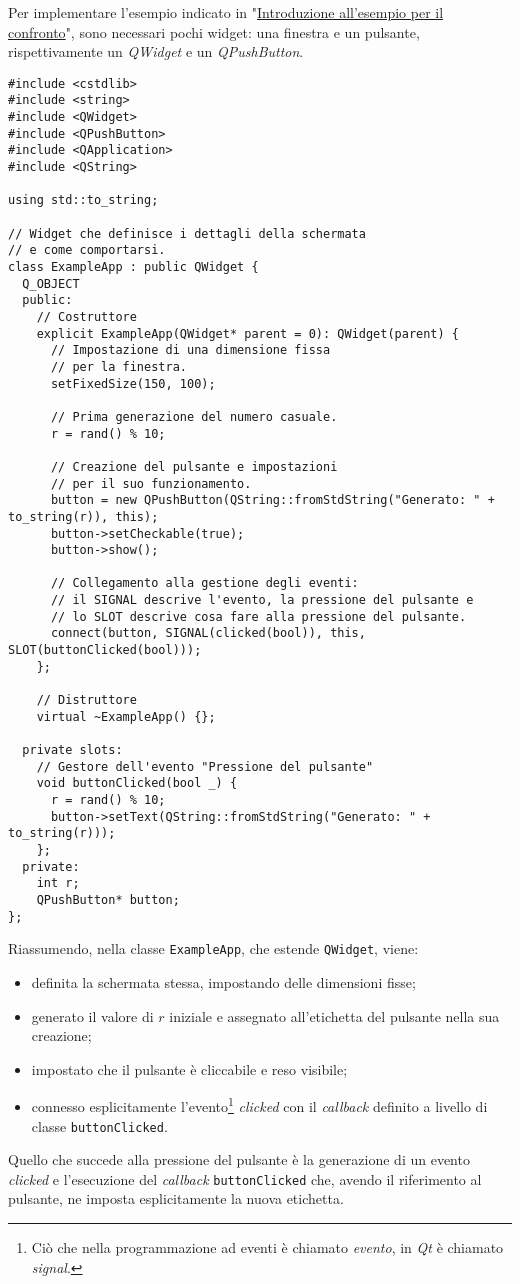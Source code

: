Per implementare l'esempio indicato in "\hyperref[sec:introduzione-esempio-confronto-paradigmi]{Introduzione all'esempio per il confronto}", sono necessari pochi widget: una finestra e un pulsante, rispettivamente un \emph{QWidget} e un \emph{QPushButton}.
\begin{lstlisting}
#include <cstdlib>
#include <string>
#include <QWidget>
#include <QPushButton>
#include <QApplication>
#include <QString>

using std::to_string;

// Widget che definisce i dettagli della schermata
// e come comportarsi.
class ExampleApp : public QWidget {
  Q_OBJECT
  public:
    // Costruttore
    explicit ExampleApp(QWidget* parent = 0): QWidget(parent) {    
      // Impostazione di una dimensione fissa
      // per la finestra.
      setFixedSize(150, 100);
        
      // Prima generazione del numero casuale.
      r = rand() % 10;
        
      // Creazione del pulsante e impostazioni
      // per il suo funzionamento.
      button = new QPushButton(QString::fromStdString("Generato: " + to_string(r)), this);
      button->setCheckable(true);
      button->show();
        
      // Collegamento alla gestione degli eventi:
      // il SIGNAL descrive l'evento, la pressione del pulsante e
      // lo SLOT descrive cosa fare alla pressione del pulsante.
      connect(button, SIGNAL(clicked(bool)), this, SLOT(buttonClicked(bool)));
    };

    // Distruttore
    virtual ~ExampleApp() {};
    
  private slots:
    // Gestore dell'evento "Pressione del pulsante"
    void buttonClicked(bool _) {
      r = rand() % 10;
      button->setText(QString::fromStdString("Generato: " + to_string(r)));
    };
  private:
    int r;
    QPushButton* button;
};
\end{lstlisting}
Riassumendo, nella classe \texttt{ExampleApp}, che estende \texttt{QWidget}, viene:
\begin{itemize}
    \item definita la schermata stessa, impostando delle dimensioni fisse;
    \item generato il valore di $r$ iniziale e assegnato all'etichetta del pulsante nella sua creazione;
    \item impostato che il pulsante è cliccabile e reso visibile;
    \item connesso esplicitamente l'evento\footnote{Ciò che nella programmazione ad eventi è chiamato \emph{evento}, in \emph{Qt} è chiamato \emph{signal}.} \emph{clicked} con il \emph{callback} definito a livello di classe \texttt{buttonClicked}.
\end{itemize}
Quello che succede alla pressione del pulsante è la generazione di un evento \emph{clicked} e l'esecuzione del \emph{callback} \texttt{buttonClicked} che, avendo il riferimento al pulsante, ne imposta esplicitamente la nuova etichetta.

